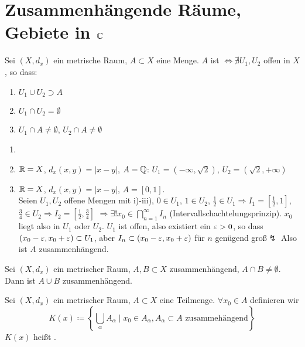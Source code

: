 \section[Zusammenh\"angende R\"aume, Gebiete in $ \C $]{Zusammenh\"angende R\"aume,\\Gebiete in $ \C $}
\begin{definition}
Sei $ (X, d_x) $ ein metrische Raum, $ A\subset X $ eine Menge. $ A $ ist $ \Leftrightarrow\nexists U_1,U_2 $ offen in $ X $, so dass:
\begin{enumerate}
\item $ U_1\cup U_2\supset A $
\item $ U_1\cap U_2=\emptyset $
\item $ U_1\cap A\neq\emptyset $, $ U_2\cap A\neq\emptyset $
\end{enumerate}
\end{definition}
\begin{beispiel*}
\begin{enumerate}
\item[]
\item $ \mathbb{R}=X $, $ d_x(x,y)=|x-y| $, $ A=\mathbb{Q} $: $ U_1=(-\infty,\sqrt{2}) $, $ U_2=(\sqrt{2},+\infty) $
\item $ \mathbb{R}=X $, $ d_x(x,y)=|x-y| $, $ A=[0,1] $.\\
Seien $ U_1,U_2 $ offene Mengen mit i)-iii), $ 0\in U_1 $, $ 1\in U_2 $, $ \frac{1}{2}\in U_1 \Rightarrow I_1=\left[\frac{1}{2},1\right]$, $ \frac{3}{4}\in U_2\Rightarrow I_2=\left[\frac{1}{2},\frac{3}{4}\right]$ $\Rightarrow\exists! x_0\in\bigcap_{n=1}^\infty I_n $ (Intervallschachtelungsprinzip). $ x_0 $ liegt also in $ U_1 $ oder $ U_2 $. $ U_1 $ ist offen, also existiert ein $ \varepsilon>0 $, so dass $ (x_0-\varepsilon,x_0+\varepsilon)\subset U_1 $, aber $ I_n\subset(x_0-\varepsilon,x_0+\varepsilon) $ f\"ur $ n $ gen\"ugend gro\ss $\lightning $ Also ist $ A $ zusammenh\"angend.
\end{enumerate} 
\end{beispiel*}
\begin{bemerkung*}
Sei $ (X,d_x) $ ein metrischer Raum, $ A,B\subset X $ zusammenh\"angend, $ A\cap B\neq\emptyset $. Dann ist $ A\cup B $ zusammenh\"angend.
\end{bemerkung*}
\begin{definition}
Sei $ (X,d_x) $ ein metrischer Raum, $ A\subset X $ eine Teilmenge. $ \forall x_0\in A $ definieren wir \[ K(x)\coloneqq\left\lbrace\bigcup_\alpha A_\alpha\mid x_0\in A_\alpha, A_\alpha\subset A\text{ zusammeh\"angend} \right\rbrace \]
$ K(x) $ hei\ss t .
\end{definition}
